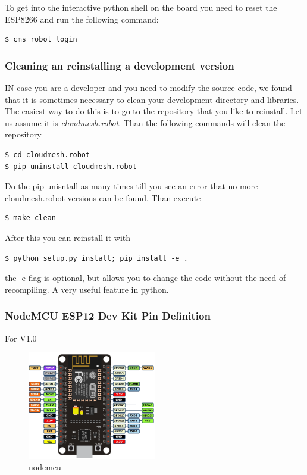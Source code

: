 To get into the interactive python shell on the board you need to reset
the ESP8266 and run the following command:

\begin{verbatim}
$ cms robot login
\end{verbatim}

\subsubsection{Cleaning an reinstalling a development
version}\label{cleaning-an-reinstalling-a-development-version}

IN case you are a developer and you need to modify the source code, we
found that it is sometimes necessary to clean your development directory
and libraries. The easiest way to do this is to go to the repository
that you like to reinstall. Let us assume it is \emph{cloudmesh.robot}.
Than the following commands will clean the repository

\begin{verbatim}
$ cd cloudmesh.robot
$ pip uninstall cloudmesh.robot
\end{verbatim}

Do the pip unisntall as many times till you see an error that no more
cloudmesh.robot versions can be found. Than execute

\begin{verbatim}
$ make clean
\end{verbatim}

After this you can reinstall it with

\begin{verbatim}
$ python setup.py install; pip install -e .
\end{verbatim}

the -e flag is optional, but allows you to change the code without the
need of recompiling. A very useful feature in python.

\subsubsection{NodeMCU ESP12 Dev Kit Pin
Definition}\label{nodemcu-esp12-dev-kit-pin-definition}

For V1.0

\begin{figure}
\centering
\includegraphics[width=0.5\textwidth]{../images/nodemcu.png}
\caption{nodemcu}
\end{figure}

